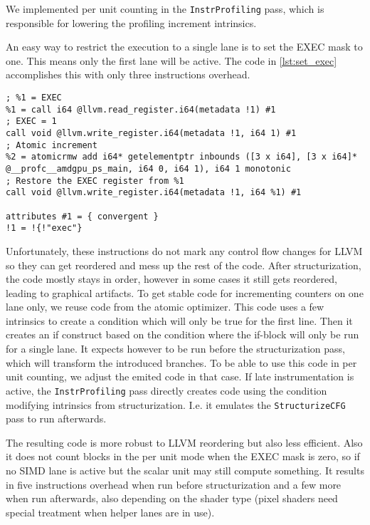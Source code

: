We implemented per unit counting in the \texttt{InstrProfiling} pass, which is responsible for lowering the profiling increment intrinsics.

An easy way to restrict the execution to a single lane is to set the EXEC mask to one. This means only the first lane will be active.
The code in \cref{lst:set_exec} accomplishes this with only three instructions overhead.
\begin{lstlisting}[caption={Restricting execution to a single SIMD unit},label=lst:set_exec,language={[x86masm]Assembler}]
; %1 = EXEC
%1 = call i64 @llvm.read_register.i64(metadata !1) #1
; EXEC = 1
call void @llvm.write_register.i64(metadata !1, i64 1) #1
; Atomic increment
%2 = atomicrmw add i64* getelementptr inbounds ([3 x i64], [3 x i64]* @__profc__amdgpu_ps_main, i64 0, i64 1), i64 1 monotonic
; Restore the EXEC register from %1
call void @llvm.write_register.i64(metadata !1, i64 %1) #1

attributes #1 = { convergent }
!1 = !{!"exec"}
\end{lstlisting}

Unfortunately, these instructions do not mark any control flow changes for LLVM so they can get reordered and mess up the rest of the code.
After structurization, the code mostly stays in order, however in some cases it still gets reordered, leading to graphical artifacts.
To get stable code for incrementing counters on one lane only, we reuse code from the atomic optimizer.
This code uses a few intrinsics to create a condition which will only be true for the first line.
Then it creates an if construct based on the condition where the if-block will only be run for a single lane.
It expects however to be run before the structurization pass, which will transform the introduced branches.
To be able to use this code in per unit counting, we adjust the emited code in that case.
If late instrumentation is active, the \texttt{InstrProfiling} pass directly creates code using the condition modifying intrinsics from structurization.
I.e. it emulates the \texttt{StructurizeCFG} pass to run afterwards.

The resulting code is more robust to LLVM reordering but also less efficient.
Also it does not count blocks in the per unit mode when the EXEC mask is zero, so if no SIMD lane is active but the scalar unit may still compute something.
It results in five instructions overhead when run before structurization and a few more when run afterwards, also depending on the shader type (pixel shaders need special treatment when helper lanes are in use).
